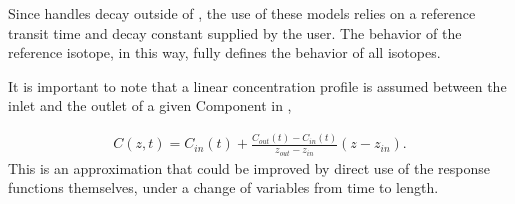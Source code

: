 Since \Cyclus handles decay outside of \Cyder, the use of these models relies on a
reference transit time and decay constant supplied by the user. The behavior of
the reference isotope, in this way, fully defines the behavior of all isotopes.

It is important to note that a linear concentration profile is assumed between
the inlet and the outlet of a given Component in \Cyder,

\begin{align}
  C(z,t) = C_{in}(t)  + \frac{C_{out}(t) - C_{in}(t)}{z_{out} - z_{in}}(z-z_{in}).
\end{align}
This is an approximation that could be improved by direct use of the response
functions themselves, under a change of variables from time to length.

